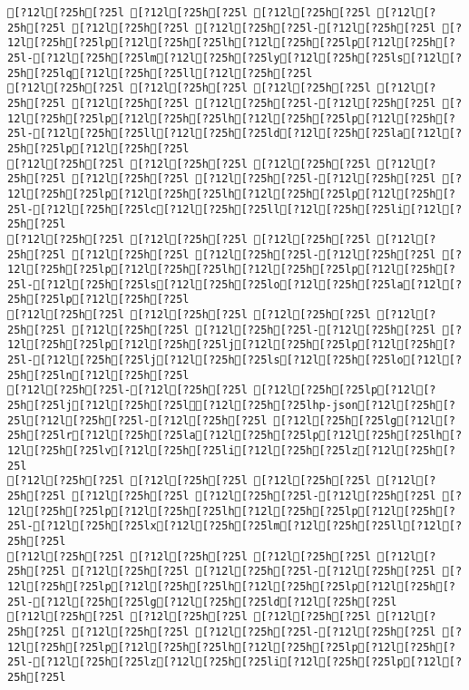 \documentclass{scrartcl}
\begin{document}
\begin{Verbatim}
[?12l[?25h[?25l [?12l[?25h[?25l [?12l[?25h[?25l [?12l[?25h[?25l [?12l[?25h[?25l [?12l[?25h[?25l-[?12l[?25h[?25l [?12l[?25h[?25lp[?12l[?25h[?25lh[?12l[?25h[?25lp[?12l[?25h[?25l-[?12l[?25h[?25lm[?12l[?25h[?25ly[?12l[?25h[?25ls[?12l[?25h[?25lq[?12l[?25h[?25ll[?12l[?25h[?25l
[?12l[?25h[?25l [?12l[?25h[?25l [?12l[?25h[?25l [?12l[?25h[?25l [?12l[?25h[?25l [?12l[?25h[?25l-[?12l[?25h[?25l [?12l[?25h[?25lp[?12l[?25h[?25lh[?12l[?25h[?25lp[?12l[?25h[?25l-[?12l[?25h[?25ll[?12l[?25h[?25ld[?12l[?25h[?25la[?12l[?25h[?25lp[?12l[?25h[?25l
[?12l[?25h[?25l [?12l[?25h[?25l [?12l[?25h[?25l [?12l[?25h[?25l [?12l[?25h[?25l [?12l[?25h[?25l-[?12l[?25h[?25l [?12l[?25h[?25lp[?12l[?25h[?25lh[?12l[?25h[?25lp[?12l[?25h[?25l-[?12l[?25h[?25lc[?12l[?25h[?25ll[?12l[?25h[?25li[?12l[?25h[?25l
[?12l[?25h[?25l [?12l[?25h[?25l [?12l[?25h[?25l [?12l[?25h[?25l [?12l[?25h[?25l [?12l[?25h[?25l-[?12l[?25h[?25l [?12l[?25h[?25lp[?12l[?25h[?25lh[?12l[?25h[?25lp[?12l[?25h[?25l-[?12l[?25h[?25ls[?12l[?25h[?25lo[?12l[?25h[?25la[?12l[?25h[?25lp[?12l[?25h[?25l
[?12l[?25h[?25l [?12l[?25h[?25l [?12l[?25h[?25l [?12l[?25h[?25l [?12l[?25h[?25l [?12l[?25h[?25l-[?12l[?25h[?25l [?12l[?25h[?25lp[?12l[?25h[?25lj[?12l[?25h[?25lp[?12l[?25h[?25l-[?12l[?25h[?25lj[?12l[?25h[?25ls[?12l[?25h[?25lo[?12l[?25h[?25ln[?12l[?25h[?25l
[?12l[?25h[?25l-[?12l[?25h[?25l [?12l[?25h[?25lp[?12l[?25h[?25lj[?12l[?25h[?25l[?12l[?25h[?25lhp-json[?12l[?25h[?25l[?12l[?25h[?25l-[?12l[?25h[?25l [?12l[?25h[?25lg[?12l[?25h[?25lr[?12l[?25h[?25la[?12l[?25h[?25lp[?12l[?25h[?25lh[?12l[?25h[?25lv[?12l[?25h[?25li[?12l[?25h[?25lz[?12l[?25h[?25l
[?12l[?25h[?25l [?12l[?25h[?25l [?12l[?25h[?25l [?12l[?25h[?25l [?12l[?25h[?25l [?12l[?25h[?25l-[?12l[?25h[?25l [?12l[?25h[?25lp[?12l[?25h[?25lh[?12l[?25h[?25lp[?12l[?25h[?25l-[?12l[?25h[?25lx[?12l[?25h[?25lm[?12l[?25h[?25ll[?12l[?25h[?25l
[?12l[?25h[?25l [?12l[?25h[?25l [?12l[?25h[?25l [?12l[?25h[?25l [?12l[?25h[?25l [?12l[?25h[?25l-[?12l[?25h[?25l [?12l[?25h[?25lp[?12l[?25h[?25lh[?12l[?25h[?25lp[?12l[?25h[?25l-[?12l[?25h[?25lg[?12l[?25h[?25ld[?12l[?25h[?25l
[?12l[?25h[?25l [?12l[?25h[?25l [?12l[?25h[?25l [?12l[?25h[?25l [?12l[?25h[?25l [?12l[?25h[?25l-[?12l[?25h[?25l [?12l[?25h[?25lp[?12l[?25h[?25lh[?12l[?25h[?25lp[?12l[?25h[?25l-[?12l[?25h[?25lz[?12l[?25h[?25li[?12l[?25h[?25lp[?12l[?25h[?25l

\end{Verbatim}
\end{document}
